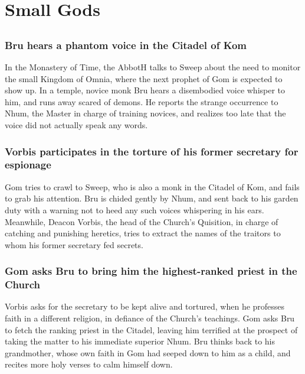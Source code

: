 \section{Small Gods}


\subsection{}
\subsubsection{\Gls{Bru} hears a phantom voice in the Citadel of Kom}
In the Monastery of Time, the \Gls{AbbotH} talks to \Gls{Sweep} about the need to monitor the
small Kingdom of Omnia, where the next prophet of \Gls{Gom} is expected to show up. In a temple,
novice monk \Gls{Bru} hears a disembodied voice whisper to him, and runs away scared of demons.
He reports the strange occurrence to \Gls{Nhum}, the Master in charge of training novices, and
realizes too late that the voice did not actually speak any words.

\subsubsection{\Gls{Vorbis} participates in the torture of his former secretary for espionage}
\Gls{Gom} tries to crawl to \Gls{Sweep}, who is also a monk in the Citadel of Kom, and fails to
grab his attention. \Gls{Bru} is chided gently by \Gls{Nhum}, and sent back to his garden duty with
a warning not to heed any such voices whispering in his ears. Meanwhile, Deacon \Gls{Vorbis}, the
head of the Church's Quisition, in charge of catching and punishing heretics, tries to extract
the names of the traitors to whom his former secretary fed secrets.

\subsubsection{\Gls{Gom} asks \Gls{Bru} to bring him the highest-ranked priest in the Church}
\Gls{Vorbis} asks for the secretary to be kept alive and tortured, when he professes faith in a
different religion, in defiance of the Church's teachings. \Gls{Gom} asks \Gls{Bru} to fetch the
ranking priest in the Citadel, leaving him terrified at the prospect of taking the matter to his
immediate superior \Gls{Nhum}. \Gls{Bru} thinks back to his grandmother, whose own faith in
\Gls{Gom} had seeped down to him as a child, and recites more holy verses to calm himself down.

